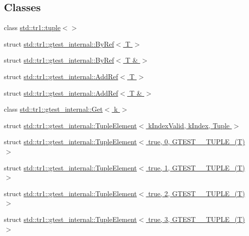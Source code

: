 \subsection*{Classes}
\begin{DoxyCompactItemize}
\item 
class \hyperlink{classstd_1_1tr1_1_1tuple}{std\+::tr1\+::tuple$<$$>$}
\item 
struct \hyperlink{structstd_1_1tr1_1_1gtest__internal_1_1ByRef}{std\+::tr1\+::gtest\+\_\+internal\+::\+By\+Ref$<$ T $>$}
\item 
struct \hyperlink{structstd_1_1tr1_1_1gtest__internal_1_1ByRef_3_01T_01_6_01_4}{std\+::tr1\+::gtest\+\_\+internal\+::\+By\+Ref$<$ T \& $>$}
\item 
struct \hyperlink{structstd_1_1tr1_1_1gtest__internal_1_1AddRef}{std\+::tr1\+::gtest\+\_\+internal\+::\+Add\+Ref$<$ T $>$}
\item 
struct \hyperlink{structstd_1_1tr1_1_1gtest__internal_1_1AddRef_3_01T_01_6_01_4}{std\+::tr1\+::gtest\+\_\+internal\+::\+Add\+Ref$<$ T \& $>$}
\item 
class \hyperlink{classstd_1_1tr1_1_1gtest__internal_1_1Get}{std\+::tr1\+::gtest\+\_\+internal\+::\+Get$<$ k $>$}
\item 
struct \hyperlink{structstd_1_1tr1_1_1gtest__internal_1_1TupleElement}{std\+::tr1\+::gtest\+\_\+internal\+::\+Tuple\+Element$<$ k\+Index\+Valid, k\+Index, Tuple $>$}
\item 
struct \hyperlink{structstd_1_1tr1_1_1gtest__internal_1_1TupleElement_3_01true_00_010_00_01GTEST__10__TUPLE___07T_08_01_4}{std\+::tr1\+::gtest\+\_\+internal\+::\+Tuple\+Element$<$ true, 0, G\+T\+E\+S\+T\+\_\+\_\+\+T\+U\+P\+L\+E\+\_\+(\+T) $>$}
\item 
struct \hyperlink{structstd_1_1tr1_1_1gtest__internal_1_1TupleElement_3_01true_00_011_00_01GTEST__10__TUPLE___07T_08_01_4}{std\+::tr1\+::gtest\+\_\+internal\+::\+Tuple\+Element$<$ true, 1, G\+T\+E\+S\+T\+\_\+\_\+\+T\+U\+P\+L\+E\+\_\+(\+T) $>$}
\item 
struct \hyperlink{structstd_1_1tr1_1_1gtest__internal_1_1TupleElement_3_01true_00_012_00_01GTEST__10__TUPLE___07T_08_01_4}{std\+::tr1\+::gtest\+\_\+internal\+::\+Tuple\+Element$<$ true, 2, G\+T\+E\+S\+T\+\_\+\_\+\+T\+U\+P\+L\+E\+\_\+(\+T) $>$}
\item 
struct \hyperlink{structstd_1_1tr1_1_1gtest__internal_1_1TupleElement_3_01true_00_013_00_01GTEST__10__TUPLE___07T_08_01_4}{std\+::tr1\+::gtest\+\_\+internal\+::\+Tuple\+Element$<$ true, 3, G\+T\+E\+S\+T\+\_\+\_\+\+T\+U\+P\+L\+E\+\_\+(\+T) $>$}

\end{DoxyCompactItemize}
